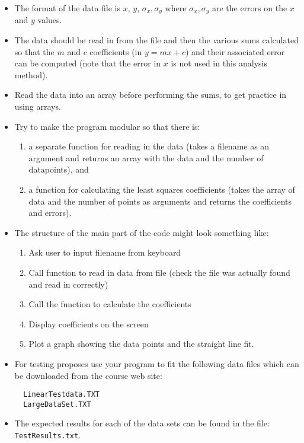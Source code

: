 \documentclass[10pt]{article}
\providecommand{\tightlist}{%
      \setlength{\itemsep}{0pt}\setlength{\parskip}{0pt}}
\begin{document}
\begin{itemize}
\item
  The format of the data file is \(x\), \(y\), \(\sigma_x, \sigma_y\)
  where \(\sigma_x, \sigma_y\) are the errors on the \(x\) and \(y\)
  values.
\item
  The data should be read in from the file and then the various sums
  calculated so that the \(m\) and \(c\) coefficients (in \(y=mx+c\))
  and their associated error can be computed (note that the error in
  \(x\) is not used in this analysis method).
\item
  Read the data into an array before performing the sums, to get
  practice in using arrays.
\item
  Try to make the program modular so that there is:

  \begin{enumerate}
  \def\labelenumi{\arabic{enumi}.}
  \tightlist
  \item
    a separate function for reading in the data (takes a filename as an
    argument and returns an array with the data and the number of
    datapoints), and
  \item
    a function for calculating the least squares coefficients (takes the
    array of data and the number of points as arguments and returns the
    coefficients and errors).
  \end{enumerate}
\item
  The structure of the main part of the code might look something like:

  \begin{enumerate}
  \def\labelenumi{\arabic{enumi}.}
  \tightlist
  \item
    Ask user to input filename from keyboard
  \item
    Call function to read in data from file (check the file was actually
    found and read in correctly)
  \item
    Call the function to calculate the coefficients
  \item
    Display coefficients on the screen
  \item
    Plot a graph showing the data points and the straight line fit.
  \end{enumerate}
\item
  For testing proposes use your program to fit the following data files
  which can be downloaded from the course web site:

\begin{verbatim}
  LinearTestdata.TXT 
  LargeDataSet.TXT
\end{verbatim}
\item
  The expected results for each of the data sets can be found in the
  file: \texttt{TestResults.txt}.
\end{itemize}
\end{document}
